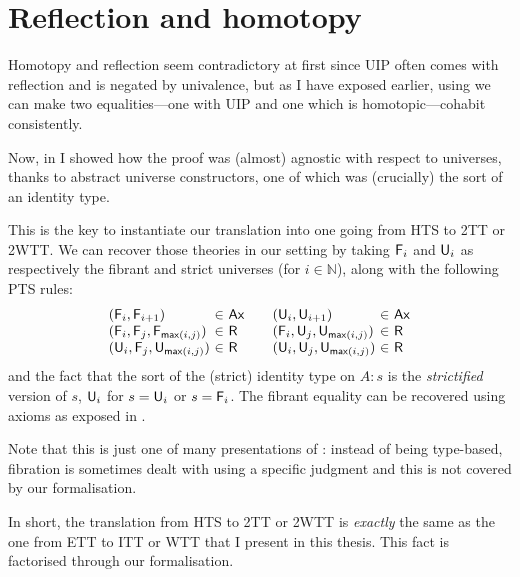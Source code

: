 \chapter{Reflection and homotopy}

Homotopy and reflection seem contradictory at first since \acrshort{UIP}
often comes with reflection and is negated by
univalence, but as I have exposed earlier, using  we can make two
equalities---one with \acrshort{UIP} and one which is homotopic---cohabit
consistently.

Now, in  I showed how the proof was
(almost) agnostic with respect to universes, thanks to abstract universe
constructors, one of which was (crucially) the sort of an identity type.

This is the key to instantiate our translation into one going from
\acrshort{HTS} to \acrshort{2TT} or \acrfull{2WTT}.
We can recover those theories in our setting by taking $\mathsf{F}_{i}$ and $\mathsf{U}_{i}$ as
respectively the fibrant and strict universes
(for $i \in \mathbb{N}$), along with the following \acrshort{PTS} rules:
%
\[
\begin{array}{l@{~}c@{~}l@{\qquad}l@{~}c@{~}l}
  (\F{i}, \F{i+1}) &\in& \Ax &
  (\Un{i}, \Un{i+1}) &\in& \Ax \\
  (\F{i}, \F{j}, \F{\nmax{i}{j}}) &\in& \Rl &
  (\F{i}, \Un{j}, \Un{\nmax{i}{j}}) &\in& \Rl \\
  (\Un{i}, \F{j}, \Un{\nmax{i}{j}}) &\in& \Rl &
  (\Un{i}, \Un{j}, \Un{\nmax{i}{j}}) &\in& \Rl \\
\end{array}
\]
%
and the fact that the sort of the (strict) identity type on $A : s$ is
the \emph{strictified} version of $s$, \ie $\mathsf{U}_{i}$ for $s = \mathsf{U}_{i}$ or
$s = \mathsf{F}_{i}$.
The fibrant equality can be recovered using axioms as exposed in
.

Note that this is just one of many presentations of : instead
of being type-based, fibration is sometimes dealt with using a specific
judgment and this is not covered by our formalisation.

In short, the translation from \acrshort{HTS} to \acrshort{2TT} or
\acrshort{2WTT} is \emph{exactly} the same as the one
from \acrshort{ETT} to \acrshort{ITT} or \acrshort{WTT} that I present in this
thesis. This fact is factorised through our formalisation.